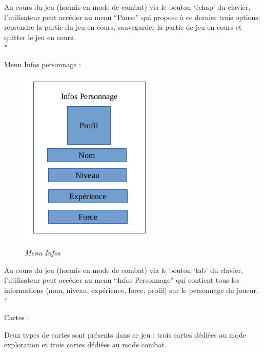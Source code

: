 \documentclass[11pt, a4paper]{article}
\begin{document}
Au cours du jeu (hormis en mode de combat) via le bouton ‘échap’ du clavier, l’utilisateur peut accéder au menu “Pause” qui propose à ce dernier trois options: reprendre la partie du jeu en cours, sauvegarder la partie de jeu en cours et quitter le jeu en cours. \\*

Menu Infos personnage : 

\begin{figure}[H]
  \centering
  \includegraphics[scale=1]{img/MenuInfosPerso.png}
  \caption{\emph{Menu Infos}}
\end{figure}

Au cours du jeu (hormis en mode de combat) via le bouton ‘tab’ du clavier, l’utilisateur peut accéder au menu “Infos Personnage” qui contient tous les informations (nom, niveau, expérience, force, profil) sur le personnage du joueur.\\*

Cartes :

Deux types de cartes sont présents dans ce jeu : trois cartes dédiées au mode exploration et trois cartes dédiées au mode combat.
\end{document}

